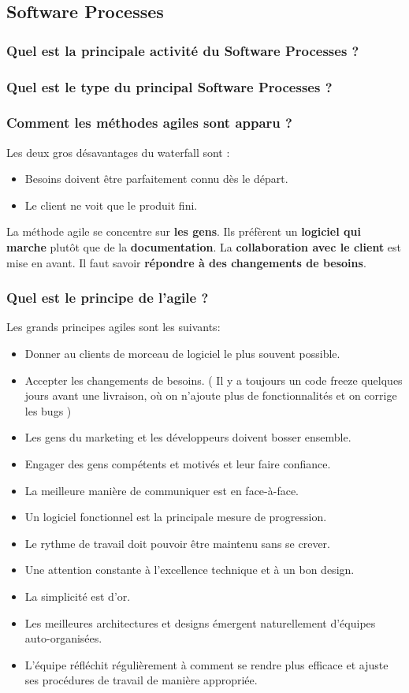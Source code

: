 \subsection{Software Processes}

\subsubsection{Quel est la principale activité du Software Processes ?}

\subsubsection{Quel est le type du principal Software Processes ?}
\subsubsection{Comment les méthodes agiles sont apparu ?}
Les deux gros désavantages du waterfall sont :
\begin{itemize}
    \item Besoins doivent être parfaitement connu dès le départ.
    \item Le client ne voit que le produit fini.
\end{itemize}
La méthode agile se concentre sur \textbf{les gens}. Ils préfèrent un \textbf{logiciel qui marche} plutôt que de la \textbf{documentation}. La \textbf{collaboration avec le client} est mise en avant. Il faut savoir \textbf{répondre à des changements de besoins}.
\subsubsection{Quel est le principe de l'agile ?}
Les grands principes agiles sont les suivants:
\begin{itemize}
	\item Donner au clients de morceau de logiciel le plus souvent possible.
	\item Accepter les changements de besoins. ( Il y a toujours un code freeze quelques jours avant une livraison, où on n’ajoute plus de fonctionnalités et on corrige les bugs )
	\item Les gens du marketing et les développeurs doivent bosser ensemble.
	\item Engager des gens compétents et motivés et leur faire confiance.
	\item La meilleure manière de communiquer est en face-à-face.
	\item Un logiciel fonctionnel est la principale mesure de progression.
	\item Le rythme de travail doit pouvoir être maintenu sans se crever.
	\item Une attention constante à l’excellence technique et à un bon design.
	\item La simplicité est d’or.
	\item Les meilleures architectures et designs émergent naturellement d’équipes auto-organisées.
	\item L’équipe réfléchit régulièrement à comment se rendre plus efficace et ajuste ses procédures de travail de manière appropriée.
\end{itemize}
